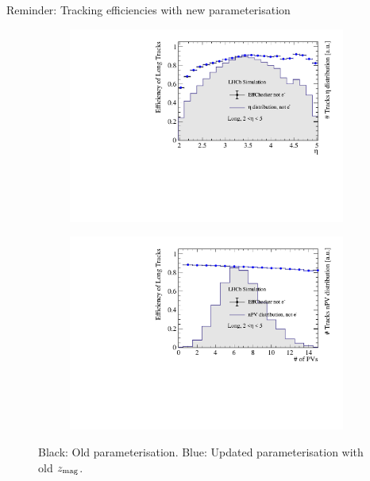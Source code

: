 \documentclass[xcolor={dvipsnames}]{beamer}
\begin{document}
\begin{frame}{Reminder: Tracking efficiencies with new parameterisation}
\begin{figure}[htb]
\begin{subfigure}{0.45\textwidth}
      \includegraphics[width=1\textwidth]{Plots/TrackEfficiency_eta_improved_MC_parameterisation.pdf}
    \end{subfigure}%
    \begin{subfigure}{0.45\textwidth}
      \includegraphics[width=1\textwidth]{Plots/TrackEfficiency_nPV_improved_MC_parameterisation.pdf}
    \end{subfigure}
    \vspace{-0.2cm}
    \caption*{Black: Old parameterisation. {\color{blue}Blue: Updated parameterisation with old $z_{\rm mag}$}.}
  \end{figure}
\end{frame}
\end{document}
